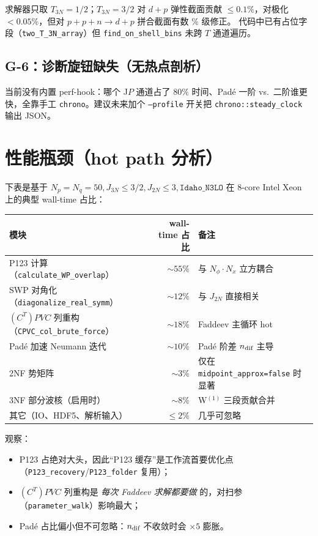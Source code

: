 求解器只取 \(T_{3N}=1/2\)；\(T_{3N}=3/2\) 对 \(d+p\) 弹性截面贡献 \(\le 0.1\%\)，对极化 \(<0.05\%\)，但对 \(p+p+n\to d+p\) 拼合截面有数 \% 级修正。
代码中已有占位字段（\texttt{two\_T\_3N\_array}）但 \texttt{find\_on\_shell\_bins} 未跨 \(T\) 通道遍历。

\subsection{G-6：诊断旋钮缺失（无热点剖析）}

当前没有内置 perf-hook：哪个 J\(P\) 通道占了 \(80\%\) 时间、Padé 一阶 vs.~二阶谁更快，全靠手工 \texttt{chrono}。建议未来加个 \texttt{--profile} 开关把
\texttt{chrono::steady\_clock} 输出 JSON。

\section{性能瓶颈（hot path 分析）}
\label{sec:appF_hotpath}

下表是基于 \(N_p=N_q=50, J_{3N}\le 3/2, J_{2N}\le 3, \texttt{Idaho\_N3LO}\) 在 8-core Intel Xeon 上的典型 wall-time 占比：

\begin{center}
\begin{tabular}{lrl}
\toprule
模块 & wall-time 占比 & 备注 \\
\midrule
P123 计算（\texttt{calculate\_WP\_overlap}） & \(\sim 55\%\) & 与 \(N_\phi\cdot N_x\) 立方耦合 \\
SWP 对角化（\texttt{diagonalize\_real\_symm}） & \(\sim 12\%\) & 与 \(J_{2N}\) 直接相关 \\
\((C^T)P V C\) 列重构（\texttt{CPVC\_col\_brute\_force}） & \(\sim 18\%\) & Faddeev 主循环 hot \\
Padé 加速 Neumann 迭代 & \(\sim 10\%\) & Padé 阶差 \(n_{\text{dif}}\) 主导 \\
2NF 势矩阵 & \(\sim 3\%\) & 仅在 \texttt{midpoint\_approx=false} 时显著 \\
3NF 部分波核（启用时） & \(\sim 8\%\) & W\(^{(1)}\) 三段贡献合并 \\
其它（IO、HDF5、解析输入） & \(\le 2\%\) & 几乎可忽略 \\
\bottomrule
\end{tabular}
\end{center}

观察：
\begin{itemize}
  \item P123 占绝对大头，因此“P123 缓存”是工作流首要优化点（\texttt{P123\_recovery}/\texttt{P123\_folder} 复用）；
  \item \((C^T)P V C\) 列重构是 \textit{每次 Faddeev 求解都要做} 的，对扫参（\texttt{parameter\_walk}）影响最大；
  \item Padé 占比偏小但不可忽略：\(n_{\text{dif}}\) 不收敛时会 \(\times 5\) 膨胀。
\end{itemize}

